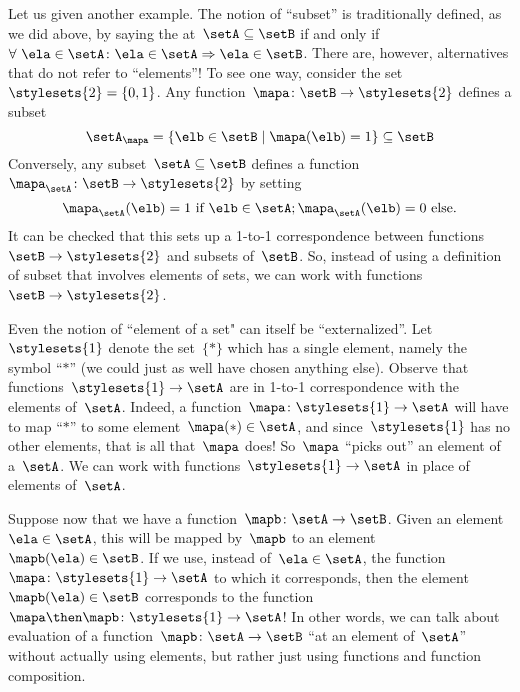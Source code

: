 Let us given another example.
The notion of ``subset'' is traditionally defined, as we did above, by saying the at~$\setA \subseteq \setB$ if and only if~$\forall \ \ela \in \setA \colon \ela \in \setA \Rightarrow \ela \in \setB$.
There are, however, alternatives that do not refer to ``elements''!
To see one way, consider the set~$\stylesets{2} = \{ 0, 1\}$.
Any function~$\mapa \colon \setB \to \stylesets{2}$ defines a subset
\begin{equation*}
\setA_\mapa = \{ \elb \in \setB \mid \mapa(\elb) = 1 \} \subseteq \setB
\end{equation*}
Conversely, any subset~$\setA \subseteq \setB$ defines a function~$\mapa_\setA \colon \setB \to \stylesets{2}$ by setting
\begin{equation*}
\mapa_\setA(\elb) = 1 \text{ if } \elb \in \setA; \mapa_\setA(\elb) = 0 \text{ else}.
\end{equation*}
It can be checked that this sets up a 1-to-1 correspondence between functions~$\setB \to \stylesets{2}$ and subsets of~$\setB$.
So, instead of using a definition of subset that involves elements of sets, we can work with functions~$\setB \to \stylesets{2}$.

Even the notion of ``element of a set" can itself be ``externalized''.
Let~$\stylesets{1}$ denote the set~$\{ * \}$ which has a single element, namely the symbol ``$*$'' (we could just as well have chosen anything else).
Observe that functions~$\stylesets{1} \to \setA$ are in 1-to-1 correspondence with the elements of~$\setA$.
Indeed, a function~$\mapa\colon \stylesets{1} \to \setA$ will have to map ``$*$'' to some element~$\mapa(*) \in \setA$, and since~$\stylesets{1}$ has no other elements, that is all that~$\mapa$ does!
So~$\mapa$ ``picks out'' an element of a~$\setA$.
We can work with functions~$\stylesets{1} \to \setA$ in place of elements of~$\setA$.

Suppose now that we have a function~$\mapb \colon \setA \to \setB$.
Given an element~$\ela \in \setA$, this will be mapped by~$\mapb$ to an element~$\mapb(\ela) \in \setB$.
If we use, instead of~$\ela \in \setA$, the function~$\mapa \colon \stylesets{1} \to \setA$ to which it corresponds, then the element~$\mapb(\ela) \in \setB$ corresponds to the function~$\mapa \then \mapb\colon \stylesets{1} \to \setA$!
In other words, we can talk about evaluation of a function~$\mapb \colon \setA \to \setB$ ``at an element of~$\setA$'' without actually using elements, but rather just using functions and function composition.







\clearpage
